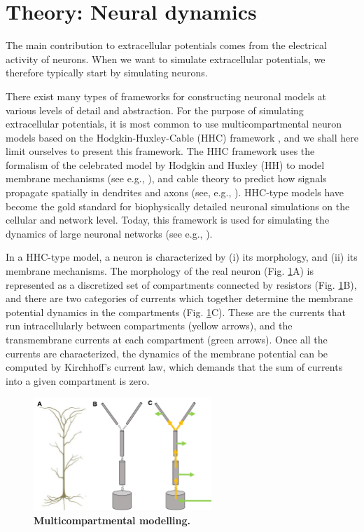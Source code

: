 \section{Theory: Neural dynamics}
\label{sec:Neuron}

The main contribution to extracellular potentials comes from the electrical activity of neurons. When we want to simulate extracellular potentials, we therefore typically start by simulating neurons. 

There exist many types of frameworks for constructing neuronal models at various levels of detail and abstraction. For the purpose of simulating extracellular potentials, it is most common to use multicompartmental neuron models based on the Hodgkin-Huxley-Cable (HHC) framework , and we shall here limit ourselves to present this framework. The HHC framework uses the formalism of the celebrated model by Hodgkin and Huxley (HH) to model membrane mechanisms (see e.g., \citep{Hodgkin1952, KockSegev1998, Pospischil2008}), and cable theory to predict how signals propagate spatially in dendrites and axons (see, e.g., \citep{Koch1999, rall2011}). HHC-type models have become the gold standard for biophysically detailed neuronal simulations on the cellular and network level. Today, this framework is used for simulating the dynamics of large neuronal networks (see e.g., \citep{traub2005, markram2015, arkhipov2018}).

In a HHC-type model, a neuron is characterized by (i) its morphology, and (ii) its membrane mechanisms. The morphology of the real neuron (Fig. \ref{Neuron:fig:multicomp}A) is represented as a discretized set of compartments connected by resistors (Fig. \ref{Neuron:fig:multicomp}B), and there are two categories of currents which together determine the membrane potential dynamics in the compartments (Fig. \ref{Neuron:fig:multicomp}C). These are the currents that run intracellularly between compartments (yellow arrows), and the transmembrane currents at each compartment (green arrows). Once all the currents are characterized, the dynamics of the membrane potential can be computed by Kirchhoff's current law, which demands that the sum of currents into a given compartment is zero.

\begin{figure}[!ht]
\begin{center}
\includegraphics[width=0.6\textwidth]{Figures/Neuron/Multicomp.png}
\end{center}
\caption{\textbf{Multicompartmental modelling.} 
}
\label{Neuron:fig:multicomp}
\end{figure}

